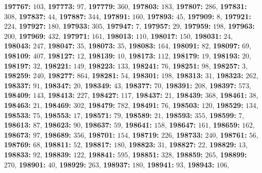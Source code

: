 \textsf{\bfseries 197767:} $103$, \textsf{\bfseries 197773:} $97$, \textsf{\bfseries 197779:} $360$, \textsf{\bfseries 197803:} $183$, \textsf{\bfseries 197807:} $286$, \textsf{\bfseries 197831:} $308$, \textsf{\bfseries 197837:} $44$, \textsf{\bfseries 197887:} $344$, \textsf{\bfseries 197891:} $160$, \textsf{\bfseries 197893:} $45$, \textsf{\bfseries 197909:} $8$, \textsf{\bfseries 197921:} $224$, \textsf{\bfseries 197927:} $180$, \textsf{\bfseries 197933:} $305$, \textsf{\bfseries 197947:} $7$, \textsf{\bfseries 197957:} $29$, \textsf{\bfseries 197959:} $198$, \textsf{\bfseries 197963:} $200$, \textsf{\bfseries 197969:} $432$, \textsf{\bfseries 197971:} $161$, \textsf{\bfseries 198013:} $110$, \textsf{\bfseries 198017:} $150$, \textsf{\bfseries 198031:} $24$, \textsf{\bfseries 198043:} $247$, \textsf{\bfseries 198047:} $35$, \textsf{\bfseries 198073:} $35$, \textsf{\bfseries 198083:} $164$, \textsf{\bfseries 198091:} $82$, \textsf{\bfseries 198097:} $69$, \textsf{\bfseries 198109:} $407$, \textsf{\bfseries 198127:} $12$, \textsf{\bfseries 198139:} $10$, \textsf{\bfseries 198173:} $112$, \textsf{\bfseries 198179:} $19$, \textsf{\bfseries 198193:} $20$, \textsf{\bfseries 198197:} $32$, \textsf{\bfseries 198221:} $149$, \textsf{\bfseries 198223:} $133$, \textsf{\bfseries 198241:} $76$, \textsf{\bfseries 198251:} $98$, \textsf{\bfseries 198257:} $3$, \textsf{\bfseries 198259:} $240$, \textsf{\bfseries 198277:} $864$, \textsf{\bfseries 198281:} $54$, \textsf{\bfseries 198301:} $198$, \textsf{\bfseries 198313:} $31$, \textsf{\bfseries 198323:} $262$, \textsf{\bfseries 198337:} $91$, \textsf{\bfseries 198347:} $20$, \textsf{\bfseries 198349:} $43$, \textsf{\bfseries 198377:} $70$, \textsf{\bfseries 198391:} $208$, \textsf{\bfseries 198397:} $573$, \textsf{\bfseries 198409:} $143$, \textsf{\bfseries 198413:} $227$, \textsf{\bfseries 198427:} $117$, \textsf{\bfseries 198437:} $21$, \textsf{\bfseries 198439:} $368$, \textsf{\bfseries 198461:} $38$, \textsf{\bfseries 198463:} $21$, \textsf{\bfseries 198469:} $302$, \textsf{\bfseries 198479:} $782$, \textsf{\bfseries 198491:} $76$, \textsf{\bfseries 198503:} $120$, \textsf{\bfseries 198529:} $134$, \textsf{\bfseries 198533:} $75$, \textsf{\bfseries 198553:} $17$, \textsf{\bfseries 198571:} $79$, \textsf{\bfseries 198589:} $21$, \textsf{\bfseries 198593:} $355$, \textsf{\bfseries 198599:} $7$, \textsf{\bfseries 198613:} $87$, \textsf{\bfseries 198623:} $90$, \textsf{\bfseries 198637:} $59$, \textsf{\bfseries 198641:} $158$, \textsf{\bfseries 198647:} $161$, \textsf{\bfseries 198659:} $162$, \textsf{\bfseries 198673:} $97$, \textsf{\bfseries 198689:} $356$, \textsf{\bfseries 198701:} $154$, \textsf{\bfseries 198719:} $226$, \textsf{\bfseries 198733:} $240$, \textsf{\bfseries 198761:} $56$, \textsf{\bfseries 198769:} $68$, \textsf{\bfseries 198811:} $52$, \textsf{\bfseries 198817:} $180$, \textsf{\bfseries 198823:} $31$, \textsf{\bfseries 198827:} $22$, \textsf{\bfseries 198829:} $13$, \textsf{\bfseries 198833:} $92$, \textsf{\bfseries 198839:} $122$, \textsf{\bfseries 198841:} $595$, \textsf{\bfseries 198851:} $328$, \textsf{\bfseries 198859:} $265$, \textsf{\bfseries 198899:} $270$, \textsf{\bfseries 198901:} $40$, \textsf{\bfseries 198929:} $263$, \textsf{\bfseries 198937:} $180$, \textsf{\bfseries 198941:} $93$, \textsf{\bfseries 198943:} $106$, 
